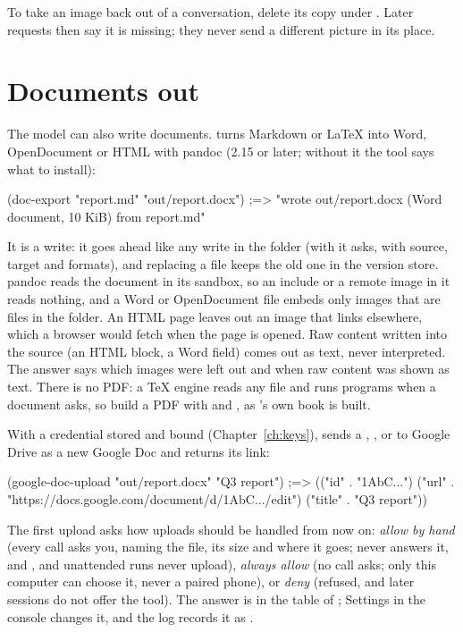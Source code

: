 \begin{tip}
To take an image back out of a conversation, delete its copy under
. Later requests then say it is missing; they
never send a different picture in its place.
\end{tip}

\section{Documents out}

The model can also write documents.  turns Markdown or
LaTeX into Word, OpenDocument or HTML with pandoc (2.15 or later; without
it the tool says what to install):

\begin{scm}
(doc-export "report.md" "out/report.docx")
;=> "wrote out/report.docx (Word document, 10 KiB) from report.md"
\end{scm}

It is a write: it goes ahead like any write in the folder (with
 it asks, with source, target and
formats), and replacing a file keeps the old one in the version store.
pandoc reads the document in its sandbox, so an
include or a remote image in it reads nothing, and a Word or OpenDocument
file embeds only images that are files in the folder. An HTML page leaves
out an image that links elsewhere, which a browser would fetch when the
page is opened. Raw content written into the source (an HTML block, a Word
field) comes out as text, never interpreted. The answer says which images
were left out and when raw content was shown as text.
There is no PDF: a TeX engine reads any file and runs programs when a
document asks, so build a PDF with  and , as
\nodwyn's own book is built.

With a  credential stored and bound (Chapter~\ref{ch:keys}),
 sends a , ,  or
 to Google Drive as a new Google Doc and returns its link:

\begin{scm}
(google-doc-upload "out/report.docx" "Q3 report")
;=> (("id" . "1AbC...") ("url" . "https://docs.google.com/document/d/1AbC.../edit") ("title" . "Q3 report"))
\end{scm}

The first upload asks how uploads should be handled from now on: \emph{allow
by hand} (every call asks you, naming the file, its size and where it
goes; \code{[approval]} never answers it, and ,
 and unattended runs never upload),
\emph{always allow} (no call asks; only this computer can choose it, never
a paired phone), or \emph{deny} (refused, and later sessions do not offer
the tool). The answer is  in the \code{[docs]} table
of ; Settings in the console changes it, and the log
records it as .


